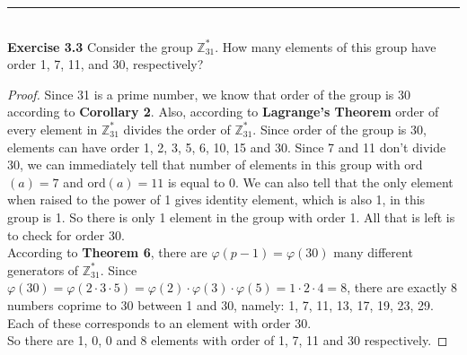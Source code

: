 \documentclass[a4paper]{article}
\begin{document}
\noindent\rule{12cm}{0.4pt}\\
\noindent \textbf{Exercise 3.3} Consider the group $\mathbb{Z}^{*}_{31}$. How many elements of this group have order 1, 7, 11, and 30, respectively?
\begin{proof}
Since 31 is a prime number, we know that order of the group is 30 according to \textbf{Corollary 2}. Also, according to \textbf{Lagrange's Theorem} order of every element in $\mathbb{Z}^{*}_{31}$ divides the order of $\mathbb{Z}^{*}_{31}$. Since order of the group is 30, elements can have order 1, 2, 3, 5, 6, 10, 15 and 30. Since 7 and 11 don't divide 30, we can immediately tell that number of elements in this group with ord$(a) = 7$ and ord$(a) = 11$ is equal to 0. We can also tell that the only element when raised to the power of 1 gives identity element, which is also 1, in this group is 1. So there is only 1 element in the group with order 1. All that is left is to check for order 30.\\
According to \textbf{Theorem 6}, there are $\varphi(p - 1) = \varphi(30)$ many different generators of $\mathbb{Z}^{*}_{31}$. Since $\varphi(30) = \varphi(2 \cdot 3 \cdot 5) = \varphi(2) \cdot \varphi(3) \cdot \varphi(5) = 1 \cdot 2 \cdot 4 = 8$, there are exactly 8 numbers coprime to 30 between 1 and 30, namely: 1, 7, 11, 13, 17, 19, 23, 29. Each of these corresponds to an element with order 30.\\
So there are 1, 0, 0 and 8 elements with order of 1, 7, 11 and 30 respectively.
\end{proof}
\end{document}
